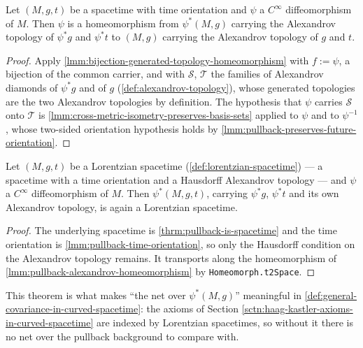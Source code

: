 \begin{lemma}
    \label{lmm:pullback-alexandrov-homeomorphism}
    Let $(M,g,t)$ be a spacetime with time orientation and $\psi$ a $C^\infty$ diffeomorphism of $M$. Then $\psi$ is a homeomorphism from $\psi^*(M,g)$ carrying the Alexandrov topology of $\psi^*g$ and $\psi^*t$ to $(M,g)$ carrying the Alexandrov topology of $g$ and $t$.
\end{lemma}
\begin{proof}
    Apply \ref{lmm:bijection-generated-topology-homeomorphism} with $f := \psi$, a bijection of the common carrier, and with $\mathcal{S}$, $\mathcal{T}$ the families of Alexandrov diamonds of $\psi^*g$ and of $g$ (\ref{def:alexandrov-topology}), whose generated topologies are the two Alexandrov topologies by definition. The hypothesis that $\psi$ carries $\mathcal{S}$ onto $\mathcal{T}$ is \ref{lmm:cross-metric-isometry-preserves-basis-sets} applied to $\psi$ and to $\psi^{-1}$, whose two-sided orientation hypothesis holds by \ref{lmm:pullback-preserves-future-orientation}.
\end{proof}

\begin{theorem}
    \label{thrm:pullback-is-lorentzian-spacetime}
    Let $(M,g,t)$ be a Lorentzian spacetime (\ref{def:lorentzian-spacetime}) --- a spacetime with a time orientation and a Hausdorff Alexandrov topology --- and $\psi$ a $C^\infty$ diffeomorphism of $M$. Then $\psi^*(M,g,t)$, carrying $\psi^*g$, $\psi^*t$ and its own Alexandrov topology, is again a Lorentzian spacetime.
\end{theorem}
\begin{proof}
    The underlying spacetime is \ref{thrm:pullback-is-spacetime} and the time orientation is \ref{lmm:pullback-time-orientation}, so only the Hausdorff condition on the Alexandrov topology remains. It transports along the homeomorphism of \ref{lmm:pullback-alexandrov-homeomorphism} by \texttt{Homeomorph.t2Space}.
\end{proof}

This theorem is what makes ``the net over $\psi^*(M,g)$'' meaningful in \ref{def:general-covariance-in-curved-spacetime}: the axioms of Section \ref{sctn:haag-kastler-axioms-in-curved-spacetime} are indexed by Lorentzian spacetimes, so without it there is no net over the pullback background to compare with.
